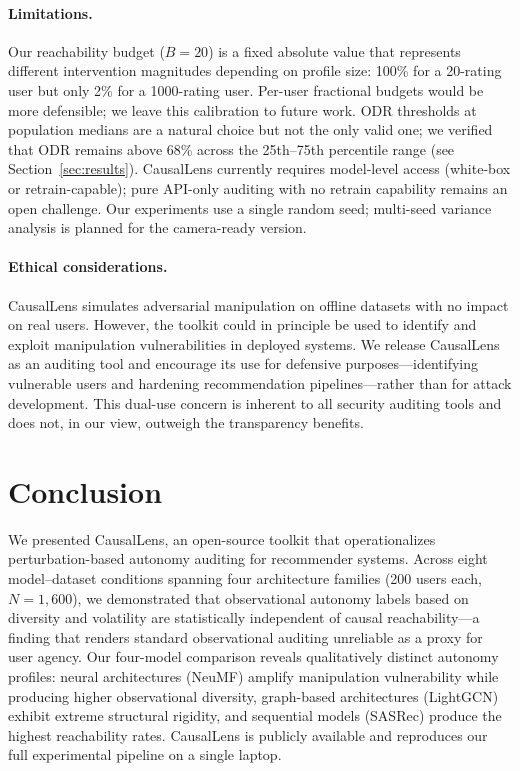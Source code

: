 \documentclass[sigconf,anonymous]{acmart}
\begin{document}
\paragraph{Limitations.}
Our reachability budget ($B = 20$) is a fixed absolute value that represents different intervention magnitudes depending on profile size: 100\% for a 20-rating user but only 2\% for a 1000-rating user. Per-user fractional budgets would be more defensible; we leave this calibration to future work. ODR thresholds at population medians are a natural choice but not the only valid one; we verified that ODR remains above 68\% across the 25th--75th percentile range (see Section~\ref{sec:results}). CausalLens currently requires model-level access (white-box or retrain-capable); pure API-only auditing with no retrain capability remains an open challenge. Our experiments use a single random seed; multi-seed variance analysis is planned for the camera-ready version.

\paragraph{Ethical considerations.}
CausalLens simulates adversarial manipulation on offline datasets with no impact on real users. However, the toolkit could in principle be used to identify and exploit manipulation vulnerabilities in deployed systems. We release CausalLens as an auditing tool and encourage its use for defensive purposes---identifying vulnerable users and hardening recommendation pipelines---rather than for attack development. This dual-use concern is inherent to all security auditing tools and does not, in our view, outweigh the transparency benefits.


\section{Conclusion}
\label{sec:conclusion}

We presented CausalLens, an open-source toolkit that operationalizes perturbation-based autonomy auditing for recommender systems. Across eight model--dataset conditions spanning four architecture families (200 users each, $N = 1{,}600$), we demonstrated that observational autonomy labels based on diversity and volatility are statistically independent of causal reachability---a finding that renders standard observational auditing unreliable as a proxy for user agency. Our four-model comparison reveals qualitatively distinct autonomy profiles: neural architectures (NeuMF) amplify manipulation vulnerability while producing higher observational diversity, graph-based architectures (LightGCN) exhibit extreme structural rigidity, and sequential models (SASRec) produce the highest reachability rates. CausalLens is publicly available and reproduces our full experimental pipeline on a single laptop.
\end{document}
